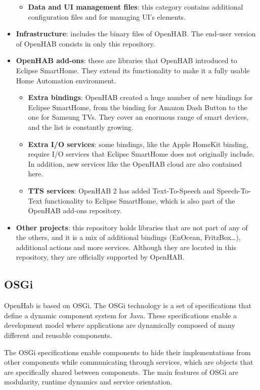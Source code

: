 \begin{itemize}
\begin{itemize}
		\item \textbf{Data and UI management files}: this category contains additional configuration files and for managing UI’s elements.
	\end{itemize}
	\item \textbf{Infrastructure}: includes the binary files of OpenHAB. The end-user version of OpenHAB consists in only this repository.
	\item \textbf{OpenHAB add-ons}: these are libraries that OpenHAB introduced to Eclipse SmartHome. They extend its functionality to 
	make it a fully usable Home Automation environment.
	\begin{itemize}
		\item \textbf{Extra bindings}: OpenHAB created a huge number of new bindings for Eclipse SmartHome, from the binding for 
		Amazon Dash Button to the one for Samsung TVs. They cover an enormous range of smart devices, and the list is constantly growing.
		\item \textbf{Extra I/O services}: some bindings, like the Apple HomeKit binding, require I/O services that Eclipse SmartHome 
		does not originally include. In addition, new services like the OpenHAB cloud are also contained here.
		\item \textbf{TTS services}: OpenHAB 2 has added Text-To-Speech and Speech-To-Text functionality to Eclipse SmartHome, which is 
		also part of the OpenHAB add-ons repository.
	\end{itemize}
	\item \textbf{Other projects}: this repository holds libraries that are not part of any of the others, and it is a mix of additional bindings 
	(EnOcean, FritzBox…), additional actions and more services. Although they are located in this repository, they are officially supported 
	by OpenHAB.
\end{itemize}

\subsection{OSGi}
OpenHab is based on OSGi. The OSGi technology is a set of specifications that define a dynamic component system for Java. These 
specifications enable a development model where applications are dynamically composed of many different and reusable components. 

The OSGi specifications enable components to hide their implementations from other components while communicating through services, 
which are objects that are specifically shared between components.\cite{openHABDocs} The main features of OSGi are modularity, 
runtime dynamics and service orientation.

